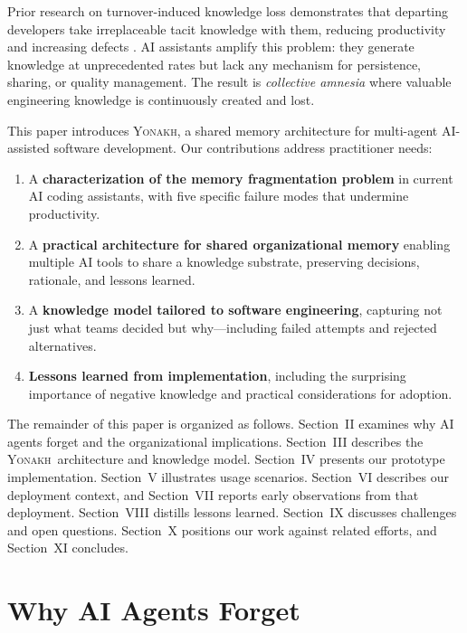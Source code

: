 \documentclass[10pt,journal,compsoc]{IEEEtran}
\newcommand{\yonakh}{\textsc{Yonakh}}
\begin{document}
Prior research on turnover-induced knowledge loss demonstrates that departing developers take irreplaceable tacit knowledge with them, reducing productivity and increasing defects \cite{rigby2016quantifying,nassif2021turnover}. AI assistants amplify this problem: they generate knowledge at unprecedented rates but lack any mechanism for persistence, sharing, or quality management. The result is \emph{collective amnesia} where valuable engineering knowledge is continuously created and lost.

This paper introduces \yonakh, a shared memory architecture for multi-agent AI-assisted software development. Our contributions address practitioner needs:

\begin{enumerate}
\item A \textbf{characterization of the memory fragmentation problem} in current AI coding assistants, with five specific failure modes that undermine productivity.

\item A \textbf{practical architecture for shared organizational memory} enabling multiple AI tools to share a knowledge substrate, preserving decisions, rationale, and lessons learned.

\item A \textbf{knowledge model tailored to software engineering}, capturing not just what teams decided but why---including failed attempts and rejected alternatives.

\item \textbf{Lessons learned from implementation}, including the surprising importance of negative knowledge and practical considerations for adoption.
\end{enumerate}

The remainder of this paper is organized as follows. Section~II examines why AI agents forget and the organizational implications. Section~III describes the \yonakh\ architecture and knowledge model. Section~IV presents our prototype implementation. Section~V illustrates usage scenarios. Section~VI describes our deployment context, and Section~VII reports early observations from that deployment. Section~VIII distills lessons learned. Section~IX discusses challenges and open questions. Section~X positions our work against related efforts, and Section~XI concludes.

\section{Why AI Agents Forget}
\end{document}
